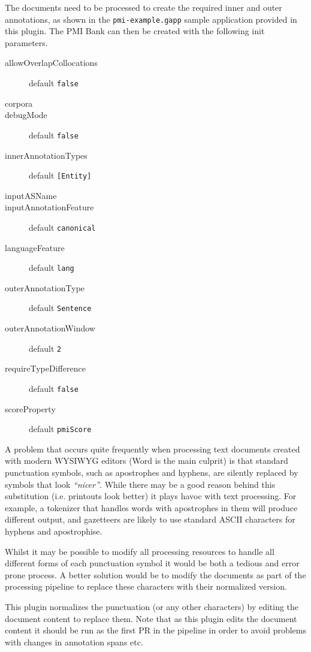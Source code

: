 The documents need to be processed to create the required inner and outer
annotations, as shown in the \texttt{pmi-example.gapp} sample application
provided in this plugin.  The PMI Bank can then be created with the following
init parameters.
\begin{description}
\item[allowOverlapCollocations] default \texttt{false}
\item[corpora]
\item[debugMode] default \texttt{false}
\item[innerAnnotationTypes] default \verb![Entity]!
\item[inputASName]
\item[inputAnnotationFeature] default \texttt{canonical}
\item[languageFeature] default \texttt{lang}
\item[outerAnnotationType] default \texttt{Sentence}
\item[outerAnnotationWindow] default \texttt{2}
\item[requireTypeDifference] default \texttt{false}
\item[scoreProperty] default \texttt{pmiScore}
\end{description}
%
%
A problem that occurs quite frequently when processing text documents created
with modern WYSIWYG editors (Word is the main culprit) is that standard
punctuation symbols, such as apostrophes and hyphens, are silently replaced
by symbols that look \textit{``nicer''}. While there may be a good reason
behind this substitution (i.e. printouts look better) it plays havoc with
text processing. For example, a tokenizer that handles words with apostrophes
in them will produce different output, and gazetteers are likely to use
standard ASCII characters for hyphens and apostrophise.

Whilst it may be possible to modify all processing resources to handle all
different forms of each punctuation symbol it would be both a tedious and
error prone process. A better solution would be to modify the documents
as part of the processing pipeline to replace these characters with their
normalized version.

This plugin normalizes the punctuation (or any other characters) by editing
the document content to replace them. Note that as this plugin edits the
document content it should be run as the first PR in the pipeline in order
to avoid problems with changes in annotation spans etc.

